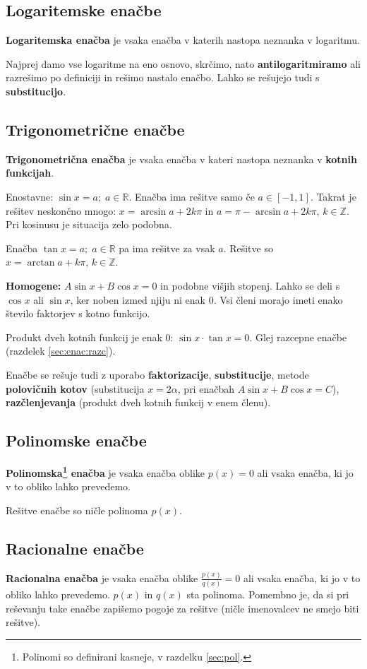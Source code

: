 \documentclass[a4paper,oneside,12pt,fleqn]{article}
\def\R{\ensuremath{\mathbb R}}
\def\Z{\ensuremath{\mathbb Z}}
\newcommand\krat\cdot
\def\kos{\cos}
\numberwithin{equation}{section}
\begin{document}
\subsection{Logaritemske enačbe}
\label{sec:enac:log}
\textbf{Logaritemska enačba} je vsaka enačba v katerih nastopa neznanka v logaritmu.

Najprej damo vse logaritme na eno osnovo, skrčimo, nato \textbf{antilogaritmiramo} ali razrešimo po
definiciji in rešimo nastalo enačbo. Lahko se rešujejo tudi s \textbf{substitucijo}.

\subsection{Trigonometrične enačbe}
\label{sec:enac:trig}
\textbf{Trigonometrična enačba} je vsaka enačba v kateri nastopa neznanka v \textbf{kotnih funkcijah}.

Enostavne: $\sin x = a; \; a \in \R$.
Enačba ima rešitve samo če $a \in [-1,1]$. Takrat je rešitev neskončno mnogo:
$x = \arcsin a + 2k\pi$ in $a = \pi - \arcsin a + 2k\pi,\, k \in \Z$. Pri kosinusu je situacija zelo
podobna.

Enačba $\tan x = a; \; a \in \R$ pa ima rešitve za vsak $a$. Rešitve so $x = \arctan a + k\pi, \, k
\in \Z$.


\textbf{Homogene:} $A\sin x + B\kos x = 0$ in podobne višjih stopenj. Lahko se deli s $\kos x$ ali
$\sin x$, ker noben izmed njiju ni enak 0. Vsi členi morajo imeti enako število faktorjev
s kotno funkcijo.

Produkt dveh kotnih funkcij je enak 0: $\sin x \krat \tan x = 0$. Glej razcepne enačbe
(razdelek \ref{sec:enac:razc}).

Enačbe se rešuje tudi z uporabo \textbf{faktorizacije}, \textbf{substitucije}, metode \textbf{polovičnih kotov}
(substitucija $x = 2\alpha$, pri enačbah $A\sin x + B\kos x = C$), \textbf{razčlenjevanja} (produkt
dveh kotnih funkcij v enem členu).

\subsection{Polinomske enačbe}
\label{sec:enac:pol}
\textbf{Polinomska\footnote{Polinomi so definirani kasneje, v razdelku \ref{sec:pol}.}
enačba} je vsaka enačba oblike $p(x) = 0$ ali vsaka enačba, ki jo v to obliko lahko prevedemo.

Rešitve enačbe so ničle polinoma $p(x)$.

\subsection{Racionalne enačbe}
\label{sec:enac:rac}
\textbf{Racionalna enačba} je vsaka enačba oblike $\frac{p(x)}{q(x)} = 0$ ali vsaka enačba, ki jo
v to obliko lahko prevedemo. $p(x)$ in $q(x)$ sta polinoma.
Pomembno je, da si pri reševanju take enačbe zapišemo pogoje
za rešitve (ničle imenovalcev ne smejo biti rešitve).
\end{document}
